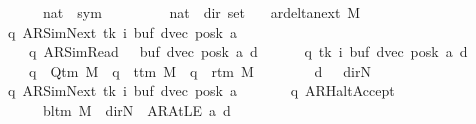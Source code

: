 \begin{isabellebody}
\ \ \ \ \ \ \ \ {\isasymtimes}\ {\isacharparenleft}{\kern0pt}nat\ {\isasymRightarrow}\ sym{}{\isacharparenright}{\kern0pt}\isanewline
\ \ \ \ \ \ \ \ {\isasymtimes}\ {\isacharparenleft}{\kern0pt}nat\ {\isasymRightarrow}\ dir{\isacharparenright}{\kern0pt}{\isacharparenright}{\kern0pt}\ set{\isachardoublequoteclose}\ \isanewline
\ \ {\isachardoublequoteopen}ar{\isacharunderscore}{\kern0pt}delta{\isacharunderscore}{\kern0pt}next\ M\ {\isacharequal}{\kern0pt}\isanewline
\ \ \ \ {\isacharbraceleft}{\kern0pt}{\isacharparenleft}{\kern0pt}{\isacharparenleft}{\kern0pt}q{\isacharcomma}{\kern0pt}\ AR{\isacharunderscore}{\kern0pt}SimNext{\isacharcomma}{\kern0pt}\ tk{\isacharcomma}{\kern0pt}\ i{\isacharcomma}{\kern0pt}\ buf{\isacharcomma}{\kern0pt}\ dvec{\isacharcomma}{\kern0pt}\ posk{\isacharparenright}{\kern0pt}{\isacharcomma}{\kern0pt}\ a{\isacharcomma}{\kern0pt}\isanewline
\ \ \ \ \ \ \ {\isacharparenleft}{\kern0pt}q{\isacharcomma}{\kern0pt}\ AR{\isacharunderscore}{\kern0pt}SimRead{\isacharcomma}{\kern0pt}\ {}{\isacharcomma}{\kern0pt}\ {}{\isacharcomma}{\kern0pt}\ buf{\isacharcomma}{\kern0pt}\ dvec{\isacharcomma}{\kern0pt}\ posk{\isacharparenright}{\kern0pt}{\isacharcomma}{\kern0pt}\ a{\isacharcomma}{\kern0pt}\ d{\isacharparenright}{\kern0pt}\ {\isacharbar}{\kern0pt}\isanewline
\ \ \ \ \ q\ tk\ i\ buf\ dvec\ posk\ a\ d{\isachardot}{\kern0pt}\isanewline
\ \ \ \ \ \ \ q\ {\isasymin}\ Q{\isacharunderscore}{\kern0pt}tm\ M\ {\isasymand}\ q\ {\isasymnoteq}\ t{\isacharunderscore}{\kern0pt}tm\ M\ {\isasymand}\ q\ {\isasymnoteq}\ r{\isacharunderscore}{\kern0pt}tm\ M\isanewline
\ \ \ \ \ \ \ {\isasymand}\ d\ {\isacharequal}{\kern0pt}\ {\isacharparenleft}{\kern0pt}{\isasymlambda}{\isacharunderscore}{\kern0pt}{\isachardot}{\kern0pt}\ dir{\isachardot}{\kern0pt}N{\isacharparenright}{\kern0pt}{\isacharbraceright}{\kern0pt}\isanewline
\ \ \ \ {\isasymunion}\isanewline
\ \ \ \ {\isacharbraceleft}{\kern0pt}{\isacharparenleft}{\kern0pt}{\isacharparenleft}{\kern0pt}q{\isacharcomma}{\kern0pt}\ AR{\isacharunderscore}{\kern0pt}SimNext{\isacharcomma}{\kern0pt}\ tk{\isacharcomma}{\kern0pt}\ i{\isacharcomma}{\kern0pt}\ buf{\isacharcomma}{\kern0pt}\ dvec{\isacharcomma}{\kern0pt}\ posk{\isacharparenright}{\kern0pt}{\isacharcomma}{\kern0pt}\ a{\isacharcomma}{\kern0pt}\isanewline
\ \ \ \ \ \ \ {\isacharparenleft}{\kern0pt}q{\isacharcomma}{\kern0pt}\ AR{\isacharunderscore}{\kern0pt}HaltAccept{\isacharcomma}{\kern0pt}\ {}{\isacharcomma}{\kern0pt}\ {}{\isacharcomma}{\kern0pt}\isanewline
\ \ \ \ \ \ \ \ {\isacharparenleft}{\kern0pt}{\isasymlambda}{\isacharunderscore}{\kern0pt}{\isachardot}{\kern0pt}\ bl{\isacharunderscore}{\kern0pt}tm\ M{\isacharparenright}{\kern0pt}{\isacharcomma}{\kern0pt}\ {\isacharparenleft}{\kern0pt}{\isasymlambda}{\isacharunderscore}{\kern0pt}{\isachardot}{\kern0pt}\ dir{\isachardot}{\kern0pt}N{\isacharparenright}{\kern0pt}{\isacharcomma}{\kern0pt}\ {\isacharparenleft}{\kern0pt}{\isasymlambda}{\isacharunderscore}{\kern0pt}{\isachardot}{\kern0pt}\ AR{\isacharunderscore}{\kern0pt}AtLE{\isacharparenright}{\kern0pt}{\isacharparenright}{\kern0pt}{\isacharcomma}{\kern0pt}\ a{\isacharcomma}{\kern0pt}\ d{\isacharparenright}{\kern0pt}\ {\isacharbar}{\kern0pt}\isanewline

\end{isabellebody}
